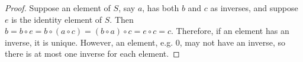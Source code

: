 \begin{proof}
    Suppose an element of $S$, say $a$, has both $b$ and $c$ as inverses, and suppose $e$ is the identity element of $S.$ Then $b = b\circ e = b\circ (a\circ c) = (b\circ a)\circ c = e\circ c = c.$ Therefore, if an element has an inverse, it is unique. However, an element, e.g. 0, may not have an inverse, so there is at most one inverse for each element.
\end{proof}